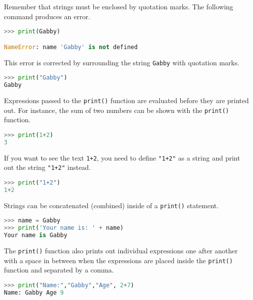 \documentclass{book}
\newcommand{\passthrough}[1]{#1}
\begin{document}
Remember that strings must be enclosed by quotation marks. The following
command produces an error.

\begin{lstlisting}[language=Python]
>>> print(Gabby)

NameError: name 'Gabby' is not defined
\end{lstlisting}

This error is corrected by surrounding the string
\passthrough{\lstinline!Gabby!} with quotation marks.

\begin{lstlisting}[language=Python]
>>> print("Gabby")
Gabby
\end{lstlisting}
    




    
        Expressions passed to the \passthrough{\lstinline!print()!} function are
evaluated before they are printed out. For instance, the sum of two
numbers can be shown with the \passthrough{\lstinline!print()!}
function.

\begin{lstlisting}[language=Python]
>>> print(1+2)
3
\end{lstlisting}

If you want to see the text \passthrough{\lstinline!1+2!}, you need to
define \passthrough{\lstinline!"1+2"!} as a string and print out the
string \passthrough{\lstinline!"1+2"!} instead.

\begin{lstlisting}[language=Python]
>>> print("1+2")
1+2
\end{lstlisting}
    




    
        Strings can be concatenated (combined) inside of a
\passthrough{\lstinline!print()!} statement.

\begin{lstlisting}[language=Python]
>>> name = Gabby
>>> print('Your name is: ' + name)
Your name is Gabby
\end{lstlisting}
    




    
        The \passthrough{\lstinline!print()!} function also prints out
individual expressions one after another with a space in between when
the expressions are placed inside the \passthrough{\lstinline!print()!}
function and separated by a comma.

\begin{lstlisting}[language=Python]
>>> print("Name:","Gabby","Age", 2+7)
Name: Gabby Age 9
\end{lstlisting}
    
\end{document}
